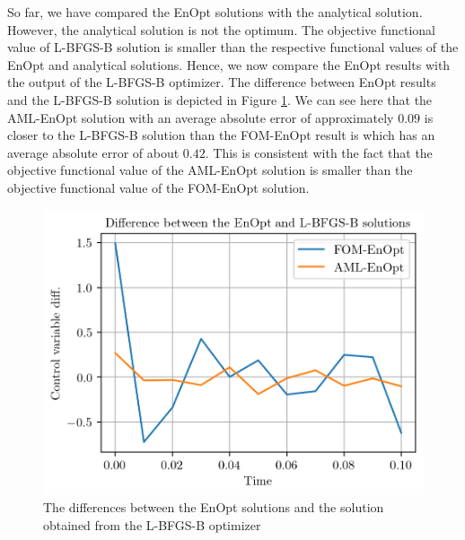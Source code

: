 So far, we have compared the EnOpt solutions with the analytical solution. However, the analytical solution is not the optimum. The objective functional value of L-BFGS-B solution is smaller than the respective functional values of the EnOpt and analytical solutions. Hence, we now compare the EnOpt results with the output of the L-BFGS-B optimizer. The difference between EnOpt results and the L-BFGS-B solution is depicted in Figure \ref{EnOptLBFGSBDifferPlot}. We can see here that the AML-EnOpt solution with an average absolute error of approximately $0.09$ is closer to the L-BFGS-B solution than the FOM-EnOpt result is which has an average absolute error of about $0.42$. This is consistent with the fact that the objective functional value of the AML-EnOpt solution is smaller than the objective functional value of the FOM-EnOpt solution.\\

\begin{figure}
\centering
\includegraphics{Plots/EnOptLBFGSBDiffer.png}
\caption{\label{EnOptLBFGSBDifferPlot}The differences between the EnOpt solutions and the solution obtained from the L-BFGS-B optimizer}
\end{figure}



